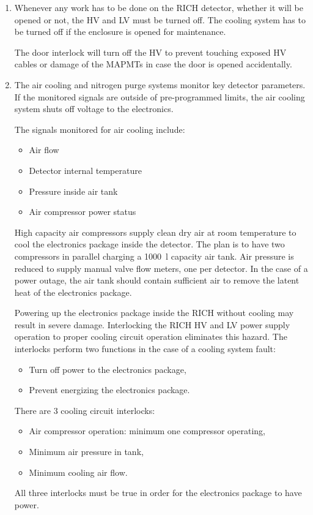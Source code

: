 \begin{enumerate}
\item Whenever any work has to be done on the RICH detector, whether it will be opened or not, the 
HV and LV must be turned off. The cooling system has to be turned off if the enclosure is opened 
for maintenance. 

The door interlock will turn off the HV to prevent touching exposed HV cables or damage of the MAPMTs 
in case the door is opened accidentally.

\item The air cooling and nitrogen purge systems monitor key detector parameters. If the monitored 
signals are outside of pre-programmed limits, the air cooling system shuts off voltage to the 
electronics.

The signals monitored for air cooling include:
\begin{itemize}
\item Air flow
\item Detector internal temperature
\item Pressure inside air tank
\item Air compressor power status
\end{itemize}

High capacity air compressors supply clean dry air at room temperature to cool the electronics 
package inside the detector. The plan is to have two compressors in parallel charging a 1000~l 
capacity air tank. Air pressure is reduced to supply manual valve flow meters, one per detector. 
In the case of a power outage, the air tank should contain sufficient air to remove the latent 
heat of the electronics package.

Powering up the electronics package inside the RICH without cooling may result in severe damage. 
Interlocking the RICH HV and LV power supply operation to proper cooling circuit operation 
eliminates this hazard. The interlocks perform two functions in the case of a cooling system fault:
\begin{itemize}
\item Turn off power to the electronics package,
\item  Prevent energizing the electronics package.
\end{itemize}
There are 3 cooling circuit interlocks:
\begin{itemize}
\item Air compressor operation: minimum one compressor operating,
\item Minimum air pressure in tank,
\item Minimum cooling air flow.
\end{itemize}
All three interlocks must be true in order for the electronics package to have power.


\end{enumerate}
